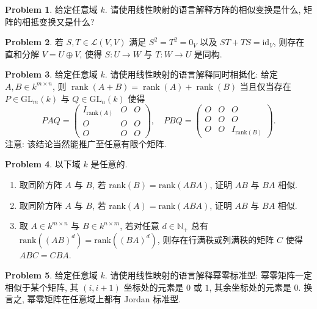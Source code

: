 \documentclass{MainStyle}
\theoremstyle{definition}
\newtheorem{problem}{Problem}
\begin{document}
\begin{problem}
给定任意域 $k$. 请使用线性映射的语言解释方阵的相似变换是什么, 矩阵的相抵变换又是什么?
\end{problem}

\begin{problem}
若 $S,T\in \mathcal L(V,V)$ 满足 $S^2=T^2=0_V$ 以及 $ST+TS=\mathrm{id}_V$, 则存在直和分解 $V=U\oplus V$, 使得 $S:U\to W$ 与 $T:W\to U$ 是同构.
\end{problem}

\begin{problem}
给定任意域 $k$. 请使用线性映射的语言解释同时相抵化: 给定 $A,B\in k^{m\times n}$, 则 $\operatorname{rank}(A+B)=\operatorname{rank}(A)+\operatorname{rank}(B)$ 当且仅当存在 $P\in \mathrm{GL}_m(k)$ 与 $Q\in \mathrm{GL}_n(k)$ 使得
\begin{equation}
    PAQ=\begin{pmatrix}I_{\mathrm{rank}(A)}&O&O\\O&O&O\\O&O&O\end{pmatrix},\quad PBQ=\begin{pmatrix}O&O&O\\O&O&O\\O&O&I_{\mathrm{rank}(B)}\end{pmatrix}.
\end{equation}
注意: 该结论当然能推广至任意有限个矩阵.
\end{problem}

\begin{problem}
以下域 $k$ 是任意的.
\begin{enumerate}
    \item 取同阶方阵 $A$ 与 $B$, 若 $\mathrm{rank}(B)=\mathrm{rank}(ABA)$, 证明 $AB$ 与 $BA$ 相似.
    \item 取同阶方阵 $A$ 与 $B$, 若 $\mathrm{rank}(A)=\mathrm{rank}(ABA)$, 证明 $AB$ 与 $BA$ 相似.
    \item 取 $A\in k^{m\times n}$ 与 $B\in k^{n\times m}$, 若对任意 $d\in \mathbb N_+$ 总有 $\mathrm{rank}((AB)^d)=\mathrm{rank}((BA)^d)$, 则存在行满秩或列满秩的矩阵 $C$ 使得 $ABC=CBA$.
\end{enumerate}
\end{problem}

\begin{problem}
给定任意域 $k$. 请使用线性映射的语言解释幂零标准型: 幂零矩阵一定相似于某个矩阵, 其 $(i,i+1)$ 坐标处的元素是 $0$ 或 $1$, 其余坐标处的元素是 $0$. 换言之, 幂零矩阵在任意域上都有 Jordan 标准型.
\end{problem}
\end{document}
